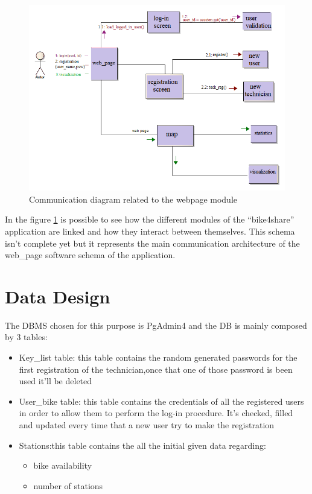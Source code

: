 \documentclass{article}
\begin{document}
\begin{figure}[H]
    \centering
    \includegraphics[width=0.75\linewidth]{image/comunication_architecture.png}
    \caption{Communication diagram related to the webpage module}
    \label{fig:webpage}
\end{figure}
In the figure \ref{fig:webpage} is possible to see how the different modules of the “bike4share” application are linked and how they interact between themselves. This schema isn’t complete yet but it represents the main communication architecture of the web\_page software schema of the application.

\section{Data Design}
The DBMS chosen for this purpose is PgAdmin4 and the DB is mainly composed by 3 tables:
\begin{itemize}
\item Key\_list table: this table contains the random generated passwords for the first registration of the technician,once that one of those password is been used it’ll be deleted 
\item User\_bike table: this table contains the credentials of all the registered users in order to allow them to perform the log-in procedure. It’s checked, filled and updated every time that a new user try to make the registration
\item Stations:this table contains the all the initial given data regarding:
 \begin{itemize}
 \item bike availability
 \item number of stations
 \end{itemize}
\end{itemize}
\end{document}
